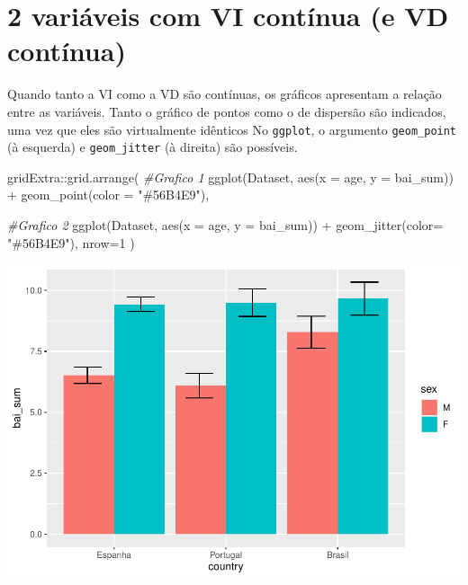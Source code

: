 \documentclass[
]{book}
\newenvironment{Shaded}{\begin{snugshade}}{\end{snugshade}}
\newcommand{\AttributeTok}[1]{\textcolor[rgb]{0.77,0.63,0.00}{#1}}
\newcommand{\CommentTok}[1]{\textcolor[rgb]{0.56,0.35,0.01}{\textit{#1}}}
\newcommand{\DecValTok}[1]{\textcolor[rgb]{0.00,0.00,0.81}{#1}}
\newcommand{\FunctionTok}[1]{\textcolor[rgb]{0.00,0.00,0.00}{#1}}
\newcommand{\NormalTok}[1]{#1}
\newcommand{\SpecialCharTok}[1]{\textcolor[rgb]{0.00,0.00,0.00}{#1}}
\newcommand{\StringTok}[1]{\textcolor[rgb]{0.31,0.60,0.02}{#1}}
\begin{document}
\hypertarget{variuxe1veis-com-vi-contuxednua-e-vd-contuxednua}{%
\section{2 variáveis com VI contínua (e VD contínua)}\label{variuxe1veis-com-vi-contuxednua-e-vd-contuxednua}}

Quando tanto a VI como a VD são contínuas, os gráficos apresentam a relação entre as variáveis. Tanto o gráfico de pontos como o de dispersão são indicados, uma vez que eles são virtualmente idênticos No \texttt{ggplot}, o argumento \texttt{geom\_point} (à esquerda) e \texttt{geom\_jitter} (à direita) são possíveis.

\begin{Shaded}
\begin{Highlighting}[]
\NormalTok{gridExtra}\SpecialCharTok{::}\FunctionTok{grid.arrange}\NormalTok{(}
  \CommentTok{\#Grafico 1}
  \FunctionTok{ggplot}\NormalTok{(Dataset, }\FunctionTok{aes}\NormalTok{(}\AttributeTok{x =}\NormalTok{ age, }\AttributeTok{y =}\NormalTok{ bai\_sum)) }\SpecialCharTok{+}
  \FunctionTok{geom\_point}\NormalTok{(}\AttributeTok{color =} \StringTok{"\#56B4E9"}\NormalTok{),}
  
  \CommentTok{\#Grafico 2}
  \FunctionTok{ggplot}\NormalTok{(Dataset, }\FunctionTok{aes}\NormalTok{(}\AttributeTok{x =}\NormalTok{ age, }\AttributeTok{y =}\NormalTok{ bai\_sum)) }\SpecialCharTok{+}
  \FunctionTok{geom\_jitter}\NormalTok{(}\AttributeTok{color=} \StringTok{"\#56B4E9"}\NormalTok{),}
  \AttributeTok{nrow=}\DecValTok{1}
\NormalTok{)}
\end{Highlighting}
\end{Shaded}

\begin{center}\includegraphics{gitbook-demo_files/figure-latex/unnamed-chunk-25-1} \end{center}
\end{document}
